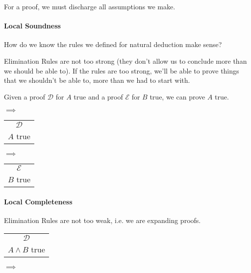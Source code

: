 \documentclass[12 pt]{article}
\begin{document}
    For a proof, we must discharge all assumptions we make.

    \paragraph{Local Soundness}
    How do we know the rules we defined for natural deduction make
    sense?

    Elimination Rules are not too strong (they don't allow us to
    conclude more than we should be able to). If the rules are too
    strong, we'll be able to prove things that we shouldn't be able
    to, more than we had to start with.

    Given a proof $\mathcal{D}$ for $A$ true and a proof $\mathcal{E}$ for
    $B$ true, we can prove $A$ true.
    \begin{center}
      \noLine
      \noLine
      \DP
      $\implies$
      \begin{tabular}{c}
      $\mathcal{D}$
      \\ $A$ true
      \end{tabular}
    \end{center}
    \begin{center}
      \noLine
      \noLine
      \DP
      $\implies$
    \begin{tabular}{c}
      $\mathcal{E}$\\ $B$ true
    \end{tabular}
    \end{center}
    \paragraph{Local Completeness}
    Elimination Rules are not too weak, i.e. we are expanding proofs.
    \begin{center}
    \begin{tabular}{c}
      $\mathcal{D}$ \\ $A \land B$ true 
    \end{tabular}
    $\implies$
    \noLine
    \noLine
    \DP
    \end{center}
\end{document}

